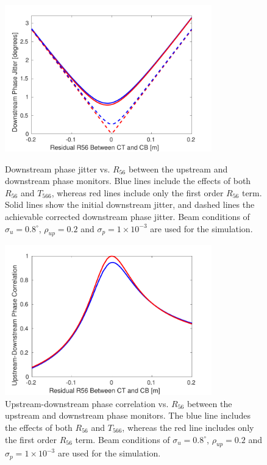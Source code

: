 \begin{figure}
  \centering
  \includegraphics[width=0.8\textwidth]{Figures/propagation/jitVsR56_t566}
  \caption{Downstream phase jitter vs. \(R_{56}\) between the upstream and downstream phase monitors. Blue lines include the effects of both \(R_{56}\) and \(T_{566}\), whereas red lines include only the first order \(R_{56}\) term. Solid lines show the initial downstream jitter, and dashed lines the achievable corrected downstream phase jitter. Beam conditions of \(\sigma_u = 0.8^\circ\), \(\rho_{up}=0.2\) and \(\sigma_p = 1 \times 10^{-3}\) are used for the simulation.}
  \label{f:jitVsR56_t566}
  \includegraphics[width=0.8\textwidth]{Figures/propagation/corrVsR56_t566}
  \caption{Upstream-downstream phase correlation vs. \(R_{56}\) between the upstream and downstream phase monitors. The blue line includes the effects of both \(R_{56}\) and \(T_{566}\), whereas the red line includes only the first order \(R_{56}\) term.  Beam conditions of \(\sigma_u = 0.8^\circ\), \(\rho_{up}=0.2\) and \(\sigma_p = 1 \times 10^{-3}\) are used for the simulation.}
  \label{f:corrVsR56_t566}
\end{figure}

